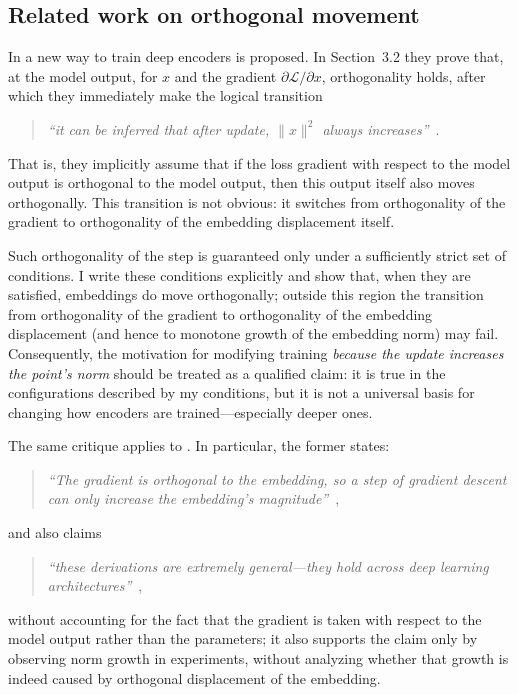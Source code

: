 \subsection{Related work on orthogonal movement}

In \cite{wang2017normface} a new way to train deep encoders is proposed. 
In Section~3.2 they prove that, at the model output, for $x$ and the gradient $\partial\mathcal{L}/\partial x$, orthogonality holds, 
after which they immediately make the logical transition 
\begin{quote}
\emph{“it can be inferred that after update, $\|x\|^2$ always increases”}\, \citep[p.~4]{wang2017normface}.
\end{quote}
That is, they implicitly assume that if the loss gradient with respect to the model output is orthogonal to the model output, then this output itself also moves orthogonally. This transition is not obvious: it switches from orthogonality of the gradient to orthogonality of the embedding displacement itself.

Such orthogonality of the step is guaranteed only under a sufficiently strict set of conditions. I write these conditions explicitly and show that, when they are satisfied, embeddings do move orthogonally; outside this region the transition from orthogonality of the gradient to orthogonality of the embedding displacement (and hence to monotone growth of the embedding norm) may fail. Consequently, the motivation for modifying training \emph{because the update increases the point's norm} should be treated as a qualified claim: it is true in the configurations described by my conditions, but it is not a universal basis for changing how encoders are trained—especially deeper ones.

The same critique applies to \cite{draganov2024pitfalls, draganov2025embeddingnorms}. 
In particular, the former states:
\begin{quote}
\emph{“The gradient is orthogonal to the embedding, so a step of gradient descent can only increase the embedding's magnitude”}\, \citep[p.~10]{draganov2024pitfalls},
\end{quote}
and also claims
\begin{quote}
\emph{“these derivations are extremely general—they hold across deep learning architectures”}\, \citep[p.~1]{draganov2024pitfalls},
\end{quote}
without accounting for the fact that the gradient is taken with respect to the model output rather than the parameters; 
it also supports the claim only by observing norm growth in experiments, without analyzing whether that growth is indeed caused by orthogonal displacement of the embedding. 

